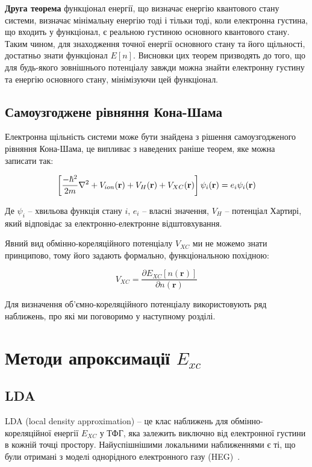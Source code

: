 \textbf{Друга теорема} функціонал енергії, що визначає енергію квантового стану системи, визначає мінімальну енергію тоді і тільки тоді, коли електронна густина, що входить у функціонал, є реальною густиною основного квантового стану.
Таким чином, для знаходження точної енергії основного стану та його щільності, достатньо знати функціонал $E[n]$. Висновки цих теорем призводять до того, що для будь-якого зовнішнього потенціалу завжди можна знайти електронну густину та енергію основного стану, мінімізуючи цей функціонал.


\subsection{Самоузгоджене рівняння Кона-Шама}
Електронна щільність системи може бути знайдена з рішення самоузгодженого рівняння Кона-Шама, це випливає з наведених раніше теорем, яке можна записати так:

\begin{equation}
    \left[{{-\hbar^2}\over{2m}}\nabla^2+V_{ion}(\textbf{r})+V_H(\textbf{r})+V_{XC}(\textbf{r})\right]\psi_i(\textbf{r}) = e_i\psi_i(\textbf{r})
\end{equation}

Де $\psi_i$ -- хвильова функція стану $i$, $e_i$ -- власні значення, $V_H$ -- потенціал Хартирі, який відповідає за електронно-електронне відштовхування.

Явний вид обмінно-кореляційного потенціалу $V_{XC}$ ми не можемо знати принципово, тому його задають формально, функціональною похідною: 

\begin{equation}
    V_{XC} = \frac{\partial E_{XC}[n(\textbf{r})]}{\partial n(\textbf{r})}
\end{equation}

Для визначення об'ємно-кореляційного потенціалу використовують ряд наближень, про які ми поговоримо у наступному розділі.


\section{Методи апроксимації \textbf{$E_{xc}$}}
\subsection{LDA}
LDA (local density approximation) -- це клас наближень для обмінно-кореляційної енергії $E_{XC}$ у ТФГ, яка залежить виключно від електронної густини в кожній точці простору. Найуспішнішими локальними наближеннями є ті, що були отримані з моделі однорідного електронного газу (HEG)~\cite{Hohenberg&Khon}. 

